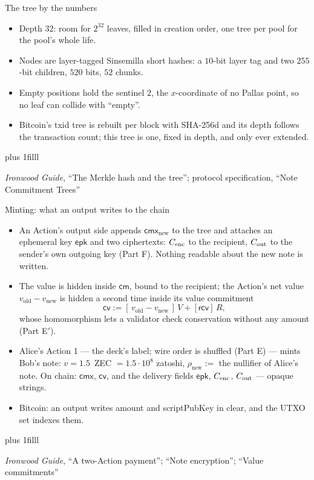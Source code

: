 \documentclass[aspectratio=169,11pt]{beamer}
\newcommand{\cmsym}{\ensuremath{\mathsf{cm}}}
\newcommand{\cmx}{\ensuremath{\mathsf{cmx}}}
\newcommand{\cvsym}{\ensuremath{\mathsf{cv}}}
\newcommand{\rcv}{\ensuremath{\mathsf{rcv}}}
\newcommand{\epk}{\ensuremath{\mathsf{epk}}}
\newcommand{\src}[1]{\par\vskip0pt plus 1filll
  {\fontsize{6}{7.2}\selectfont\color{arbdim}\raggedright #1\par}}
\begin{document}
\begin{frame}{The tree by the numbers}
\begin{itemize}
  \item Depth $32$: room for $2^{32}$ leaves, filled in creation order,
    one tree per pool for the pool's whole life.
  \item Nodes are layer-tagged Sinsemilla short hashes: a $10$-bit
    layer tag and two $255$-bit children, $520$ bits, $52$ chunks.
  \item Empty positions hold the sentinel $2$, the $x$-coordinate of no
    Pallas point, so no leaf can collide with ``empty''.
  \item Bitcoin's txid tree is rebuilt per block with SHA-256d and its
    depth follows the transaction count; this tree is one, fixed in
    depth, and only ever extended.
\end{itemize}
\src{\emph{Ironwood Guide}, ``The Merkle hash and the tree'';
  protocol specification, ``Note Commitment Trees''}
\end{frame}

\begin{frame}{Minting: what an output writes to the chain}
\begin{itemize}
  \item An Action's output side appends $\cmx_{\mathrm{new}}$ to the
    tree and attaches an ephemeral key $\epk$ and two ciphertexts:
    $C_{\mathrm{enc}}$ to the recipient, $C_{\mathrm{out}}$ to the sender's own outgoing key
    (Part F). Nothing readable about the new note is written.
  \item The value is hidden inside $\cmsym$, bound to the recipient;
    the Action's net value $v_{\mathrm{old}} - v_{\mathrm{new}}$ is
    hidden a second time inside its value commitment
    \[
    \cvsym := [\,v_{\mathrm{old}} - v_{\mathrm{new}}\,]\,V + [\rcv]\,R,
    \]
    whose homomorphism lets a validator check conservation without
    any amount (Part E$'$).
  \item Alice's Action 1 --- the deck's label; wire order is shuffled
    (Part E) --- mints Bob's note: $v = 1.5$~ZEC $= 1.5 \cdot 10^{8}$
    zatoshi, $\rho_{\mathrm{new}} :=$ the nullifier of Alice's note. On
    chain: $\cmx$, $\cvsym$, and the delivery fields $\epk$, $C_{\mathrm{enc}}$,
    $C_{\mathrm{out}}$ --- opaque strings.
  \item Bitcoin: an output writes \textsf{amount} and
    \textsf{scriptPubKey} in clear, and the UTXO set indexes them.
\end{itemize}
\src{\emph{Ironwood Guide}, ``A two-Action payment''; ``Note encryption'';
  ``Value commitments''}
\end{frame}
\end{document}
